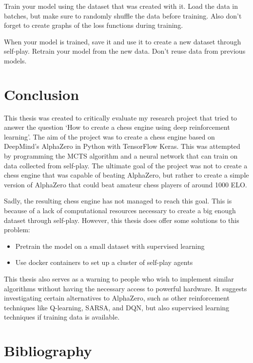 \documentclass{article}
\begin{document}
Train your model using the dataset that was created with it. Load the data in batches, but make sure to 
randomly shuffle the data before training. Also don't forget to create graphs of the loss functions during training.

When your model is trained, save it and use it to create a new dataset through self-play. 
Retrain your model from the new data. Don't reuse data from previous models.

\newpage
\section{Conclusion}

This thesis was created to critically evaluate my research project that tried to 
answer the question `How to create a chess engine using deep reinforcement learning'.
The aim of the project was to create a chess engine based on DeepMind's AlphaZero in
Python with TensorFlow Keras. This was attempted by programming the MCTS algorithm 
and a neural network that can train on data collected from self-play. 
The ultimate goal of the project was not to create a chess engine that was capable of 
beating AlphaZero, but rather to create a simple version of AlphaZero that could 
beat amateur chess players of around 1000 ELO. 

Sadly, the resulting chess engine has not managed to reach this goal.
This is because of a lack of computational resources necessary to create a big enough
dataset through self-play. However, this thesis does offer some solutions to this problem:

\begin{itemize}
    \item Pretrain the model on a small dataset with supervised learning
    \item Use docker containers to set up a cluster of self-play agents
\end{itemize}

This thesis also serves as a warning to people who wish to implement similar algorithms
without having the necessary access to powerful hardware. It suggests investigating certain 
alternatives to AlphaZero, such as other reinforcement techniques like Q-learning, SARSA, and DQN,
but also supervised learning techniques if training data is available.




\newpage
\section{Bibliography}
\renewcommand{\bibname}{}
\printbibliography[heading=none]
\end{document}
